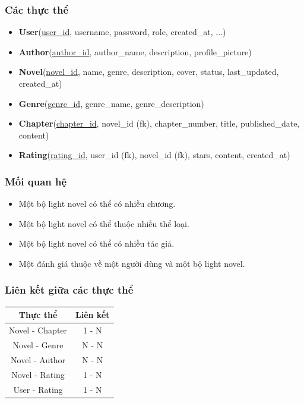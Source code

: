 \documentclass[12pt,aspectratio=169,handout]{beamer}
\begin{document}
\begin{frame}
    \frametitle{Các thực thể}
    \begin{itemize}
        \item \textbf{User}(\underline{user\_id}, username, password, role, created\_at, ...)
        \item \textbf{Author}(\underline{author\_id}, author\_name, description, profile\_picture)
        \item \textbf{Novel}(\underline{novel\_id}, name, genre, description, cover, status, last\_updated, created\_at)
        \item \textbf{Genre}(\underline{genre\_id}, genre\_name, genre\_description)
        \item \textbf{Chapter}(\underline{chapter\_id}, novel\_id (fk), chapter\_number, title, published\_date, content)
        \item \textbf{Rating}(\underline{rating\_id}, user\_id (fk), novel\_id (fk), stars, content, created\_at)
    \end{itemize}
\end{frame}

\begin{frame}
    \frametitle{Mối quan hệ}
    \begin{itemize}
        \item Một bộ light novel có thể có nhiều chương.
        \item Một bộ light novel có thể thuộc nhiều thể loại.
        \item Một bộ light novel có thể có nhiều tác giả.
        \item Một đánh giá thuộc về một người dùng và một bộ light novel.
    \end{itemize}
\end{frame}

\begin{frame}
	\frametitle{Liên kết giữa các thực thể}
	\begin{center}
		\begin{tabular}{|c|c|}
			\hline
			\textbf{Thực thể} & \textbf{Liên kết} \\
			\hline
			Novel - Chapter & 1 - N \\
			Novel - Genre & N - N \\
			Novel - Author & N - N \\
			Novel - Rating & 1 - N \\
			User - Rating & 1 - N \\
			\hline
		\end{tabular}
	\end{center}
\end{frame}
\end{document}
